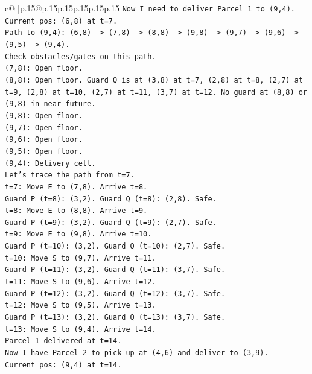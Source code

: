 \documentclass{article}
\begin{document}
{\begin{supertabular}{c@{$\;$}|p{.15\linewidth}@{}p{.15\linewidth}p{.15\linewidth}p{.15\linewidth}p{.15\linewidth}p{.15\linewidth}}
{{{\texttt{Now I need to deliver Parcel 1 to (9,4).} \\
\texttt{Current pos: (6,8) at t=7.} \\
\texttt{Path to (9,4): (6,8) {-}> (7,8) {-}> (8,8) {-}> (9,8) {-}> (9,7) {-}> (9,6) {-}> (9,5) {-}> (9,4).} \\
\texttt{Check obstacles/gates on this path.} \\
\texttt{(7,8): Open floor.} \\
\texttt{(8,8): Open floor. Guard Q is at (3,8) at t=7, (2,8) at t=8, (2,7) at t=9, (2,8) at t=10, (2,7) at t=11, (3,7) at t=12. No guard at (8,8) or (9,8) in near future.} \\
\texttt{(9,8): Open floor.} \\
\texttt{(9,7): Open floor.} \\
\texttt{(9,6): Open floor.} \\
\texttt{(9,5): Open floor.} \\
\texttt{(9,4): Delivery cell.} \\
\texttt{Let's trace the path from t=7.} \\
\texttt{t=7: Move E to (7,8). Arrive t=8.} \\
\texttt{Guard P (t=8): (3,2). Guard Q (t=8): (2,8). Safe.} \\
\texttt{t=8: Move E to (8,8). Arrive t=9.} \\
\texttt{Guard P (t=9): (3,2). Guard Q (t=9): (2,7). Safe.} \\
\texttt{t=9: Move E to (9,8). Arrive t=10.} \\
\texttt{Guard P (t=10): (3,2). Guard Q (t=10): (2,7). Safe.} \\
\texttt{t=10: Move S to (9,7). Arrive t=11.} \\
\texttt{Guard P (t=11): (3,2). Guard Q (t=11): (3,7). Safe.} \\
\texttt{t=11: Move S to (9,6). Arrive t=12.} \\
\texttt{Guard P (t=12): (3,2). Guard Q (t=12): (3,7). Safe.} \\
\texttt{t=12: Move S to (9,5). Arrive t=13.} \\
\texttt{Guard P (t=13): (3,2). Guard Q (t=13): (3,7). Safe.} \\
\texttt{t=13: Move S to (9,4). Arrive t=14.} \\
\texttt{Parcel 1 delivered at t=14.} \\
\texttt{Now I have Parcel 2 to pick up at (4,6) and deliver to (3,9).} \\
\texttt{Current pos: (9,4) at t=14.} \\
}}}
\end{supertabular}}
\end{document}
